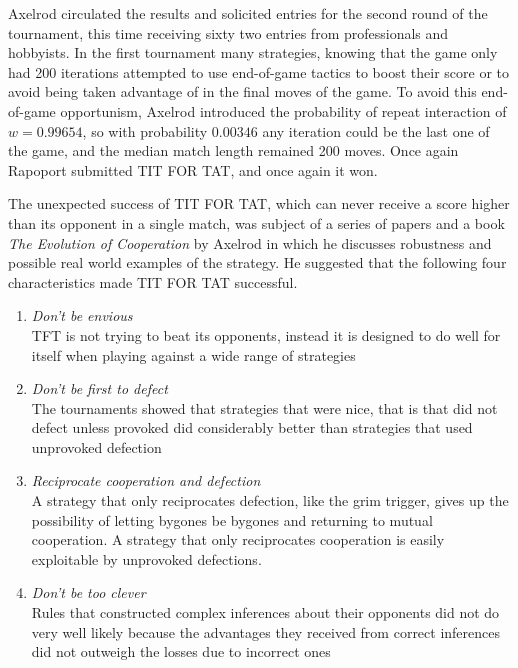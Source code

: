 Axelrod circulated the results and solicited entries for the second round of the tournament, this time receiving sixty two entries from professionals and hobbyists. In the first tournament many strategies, knowing that the game only had 200 iterations attempted to use end-of-game tactics to boost their score or to avoid being taken advantage of in the final moves of the game. To avoid this end-of-game opportunism, Axelrod introduced the probability of repeat interaction of $w = 0.99654$, so with probability $0.00346$ any iteration could be the last one of the game, and the median match length remained 200 moves. Once again Rapoport submitted TIT FOR TAT, and once again it won.

The unexpected success of TIT FOR TAT, which can never receive a score higher than its opponent in a single match, was subject of a series of papers and a book \textit{The Evolution of Cooperation} by Axelrod in which he discusses robustness and possible real world examples of the strategy. He suggested that the following four characteristics made TIT FOR TAT successful.
\begin{enumerate}
\item \textit{Don't be envious} \\
TFT is not trying to beat its opponents, instead it is designed to do well for itself when playing against a wide range of strategies
\item \textit{Don't be first to defect} \\
The tournaments showed that strategies that were nice, that is that did not defect unless provoked did considerably better than strategies that used unprovoked defection
\item \textit{Reciprocate cooperation and defection} \\
A strategy that only reciprocates defection, like the grim trigger, gives up the possibility of letting bygones be bygones and returning to mutual cooperation. A strategy that only reciprocates cooperation is easily exploitable by unprovoked defections.
\item \textit{Don't be too clever} \\
Rules that constructed complex inferences about their opponents did not do very well likely because the advantages they received from correct inferences did not outweigh the losses due to incorrect ones
\end{enumerate}

